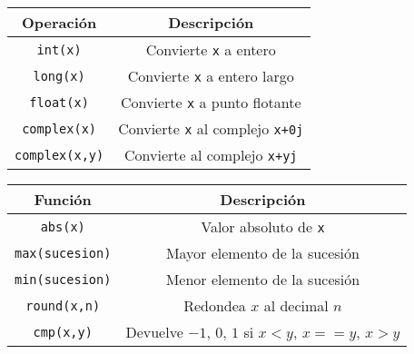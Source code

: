 \begin{frame}
\fontsize{12}{12}\selectfont
\begin{center}
\begin{tabular}{| c | c |}
\hline
Operaci\'{o}n & Descripci\'{o}n \\
\hline \texttt{int(x)} & Convierte \texttt{x} a entero \\
\hline \texttt{long(x)} & Convierte \texttt{x} a entero largo \\
\hline \texttt{float(x)} & Convierte \texttt{x} a punto flotante \\
\hline \texttt{complex(x)} & Convierte \texttt{x} al complejo \texttt{x+0j} \\
\hline \texttt{complex(x,y)} & Convierte al complejo \texttt{x+yj} \\
\hline
\end{tabular}
\end{center}
\end{frame}
\begin{frame}
\fontsize{12}{12}\selectfont
\begin{center}
\begin{tabular}{| c | c |}
\hline
Funci\'{o}n & Descripci\'{o}n \\
\hline \texttt{abs(x)} & Valor absoluto de \texttt{x} \\
\hline \texttt{max(sucesion)} & Mayor elemento de la sucesi\'{o}n \\
\hline \texttt{min(sucesion)} & Menor elemento de la sucesi\'{o}n \\
\hline \texttt{round(x,n)} & Redondea $x$ al decimal $n$ \\
\hline \texttt{cmp(x,y)} & Devuelve $-1$, $0$, $1$ si $x<y$, $x==y$, $x>y$ \\
\hline
\end{tabular}
\end{center}
\end{frame}
